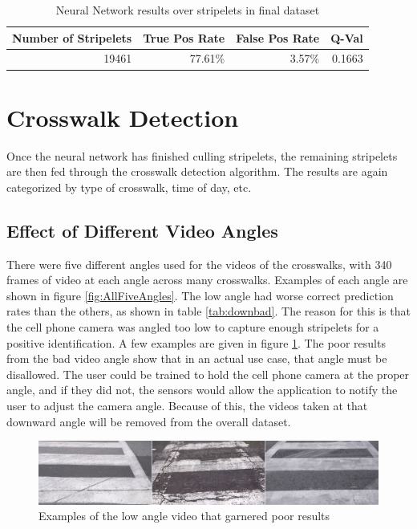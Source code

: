     \begin{table}[t]
        \begin{longtable}{|r|r|r|r|}
        \caption{Neural Network results over stripelets in final dataset}
        \label{tab:nnresultsoverall}\\
        \hline
        Number of Stripelets & True Pos Rate & False Pos Rate & Q-Val \bigstrut\\
        \hline
        19461 & 77.61\% & 3.57\% & 0.1663 \bigstrut\\
        \hline
        \end{longtable}
    \end{table}

\clearpage





\section{Crosswalk Detection}
Once the neural network has finished culling stripelets, the remaining stripelets are then fed through the crosswalk detection algorithm. The results are again categorized by type of crosswalk, time of day, etc. 

\clearpage

\subsection{Effect of Different Video Angles}

There were five different angles used for the videos of the crosswalks, with 340 frames of video at each angle across many crosswalks. Examples of each angle are shown in figure \ref{fig:AllFiveAngles}. The low angle had worse correct prediction rates than the others, as shown in table \ref{tab:downbad}. The reason for this is that the cell phone camera was angled too low to capture enough stripelets for a positive identification. A few examples are given in figure \ref{fig:downBadPic}. The poor results from the bad video angle show that in an actual use case, that angle must be disallowed. The user could be trained to hold the cell phone camera at the proper angle, and if they did not, the sensors would allow the application to notify the user to adjust the camera angle. Because of this, the videos taken at that downward angle will be removed from the overall dataset. 

\begin{figure}[t]
\begin{center}
\includegraphics[width=15cm]{figures/DownBad.png}
\captionfonts
\caption{Examples of the low angle video that garnered poor results}
\label{fig:downBadPic}
\end{center}
\end{figure}

